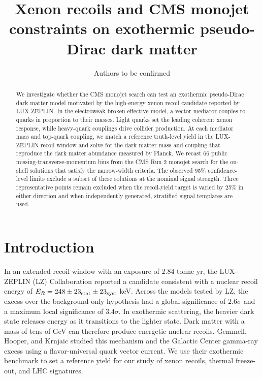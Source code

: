 \documentclass[aps,prd,reprint,superscriptaddress,longbibliography,floatfix]{revtex4-2}
\begin{document}
\title{Xenon recoils and CMS monojet constraints on exothermic pseudo-Dirac dark matter}

\author{Authors to be confirmed}

\begin{abstract}
We investigate whether the CMS monojet search can test an exothermic pseudo-Dirac dark matter model motivated by the high-energy xenon recoil candidate reported by LUX-ZEPLIN. In the electroweak-broken effective model, a vector mediator couples to quarks in proportion to their masses. Light quarks set the leading coherent xenon response, while heavy-quark couplings drive collider production. At each mediator mass and top-quark coupling, we match a reference truth-level yield in the LUX-ZEPLIN recoil window and solve for the dark matter mass and coupling that reproduce the dark matter abundance measured by Planck. We recast 66 public missing-transverse-momentum bins from the CMS Run 2 monojet search for the on-shell solutions that satisfy the narrow-width criteria. The observed 95\% confidence-level limits exclude a subset of these solutions at the nominal signal strength. Three representative points remain excluded when the recoil-yield target is varied by 25\% in either direction and when independently generated, stratified signal templates are used.
\end{abstract}

\maketitle

\section{Introduction}
\label{sec:introduction}

In an extended recoil window with an exposure of $2.84$ tonne yr, the LUX-ZEPLIN (LZ) Collaboration reported a candidate consistent with a nuclear recoil energy of $E_R=248\pm23_{\rm stat}\pm23_{\rm syst}$ keV. Across the models tested by LZ, the excess over the background-only hypothesis had a global significance of $2.6\sigma$ and a maximum local significance of $3.4\sigma$. In exothermic scattering, the heavier dark state releases energy as it transitions to the lighter state. Dark matter with a mass of tens of GeV can therefore produce energetic nuclear recoils. Gemmell, Hooper, and Krnjaic studied this mechanism and the Galactic Center gamma-ray excess using a flavor-universal quark vector current. We use their exothermic benchmark to set a reference yield for our study of xenon recoils, thermal freeze-out, and LHC signatures. \cite{lz2026,gemmell2026}
\end{document}
